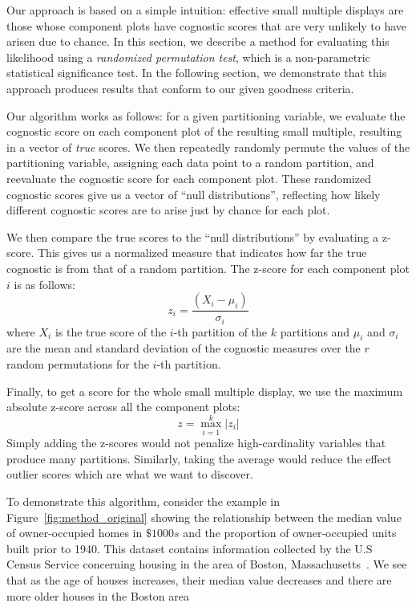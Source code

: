 Our approach is based on a simple intuition: effective small multiple displays are those whose component plots have cognostic scores that are very unlikely to have arisen due to chance. In this section, we describe a method for evaluating this likelihood using a \emph{randomized permutation test}, which is a non-parametric statistical significance test. In the following section, we demonstrate that this approach produces results that conform to our given goodness criteria.

Our algorithm works as follows: for a given partitioning variable, we evaluate the cognostic score on each component plot of the resulting small multiple, resulting in a vector of \emph{true} scores. We then repeatedly randomly permute the values of the partitioning variable, assigning each data point to a random partition, and reevaluate the cognostic score for each component plot. These randomized cognostic scores give us a vector of ``null distributions'', reflecting how likely different cognostic scores are to arise just by chance for each plot.

We then compare the true scores to the ``null distributions'' by evaluating a z-score. This gives us a normalized measure that indicates how far the true cognostic is from that of a random partition. The z-score for each component plot $i$ is as follows:
$$z_i = \frac{(X_i-\mu_i)}{\sigma_i}$$ 
where $X_i$ is the true score of the $i$-th partition of the $k$ partitions and $\mu_i$ and $\sigma_i$ are the mean and standard deviation of the cognostic measures over the $r$ random permutations for the $i$-th partition.

Finally, to get a score for the whole small multiple display, we use the maximum absolute z-score across all the component plots: 
$$z = \max_{i=1}^k |z_i|$$ 
Simply adding the z-scores would not penalize high-cardinality variables that produce many partitions. Similarly, taking the average would reduce the effect outlier scores which are what we want to discover.

To demonstrate this algorithm, consider the example in Figure~\ref{fig:method_original} showing the relationship between the median value of owner-occupied homes in $\$1000s$ and the proportion of owner-occupied units built prior to 1940. This dataset contains information collected by the U.S Census Service concerning housing in the area of Boston, Massachusetts~\cite{Harrison1978}. We see that as the age of houses increases, their median value decreases and there are more older houses in the Boston area

